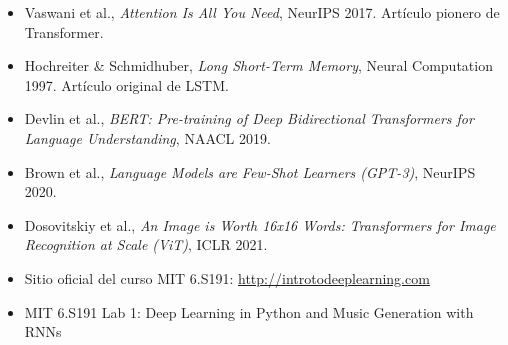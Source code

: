 \begin{itemize}
    \item Vaswani et al., \textit{Attention Is All You Need}, NeurIPS 2017. Artículo pionero de Transformer.
    \item Hochreiter \& Schmidhuber, \textit{Long Short-Term Memory}, Neural Computation 1997. Artículo original de LSTM.
    \item Devlin et al., \textit{BERT: Pre-training of Deep Bidirectional Transformers for Language Understanding}, NAACL 2019.
    \item Brown et al., \textit{Language Models are Few-Shot Learners (GPT-3)}, NeurIPS 2020.
    \item Dosovitskiy et al., \textit{An Image is Worth 16x16 Words: Transformers for Image Recognition at Scale (ViT)}, ICLR 2021.
    \item Sitio oficial del curso MIT 6.S191: \url{http://introtodeeplearning.com}
    \item MIT 6.S191 Lab 1: Deep Learning in Python and Music Generation with RNNs
\end{itemize}



